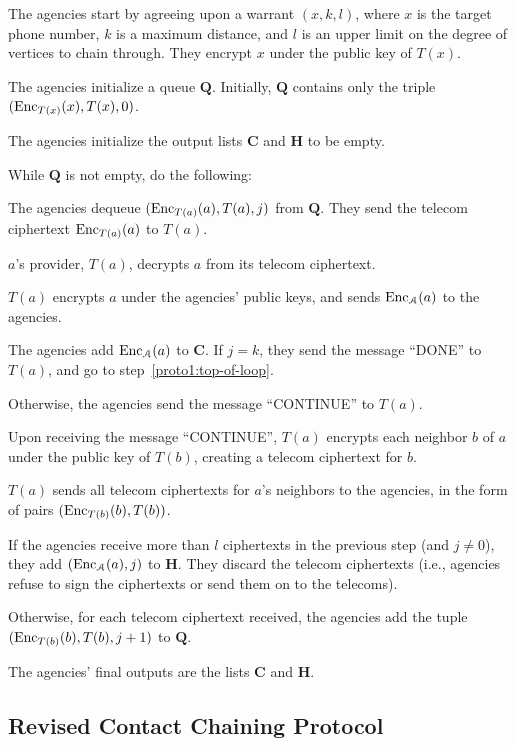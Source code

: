 \bce
\item The agencies start by agreeing upon a warrant $(x, k, l)$, where $x$ is the target phone number, $k$ is a maximum distance, and $l$ is an upper limit on the degree of vertices to chain through. They encrypt $x$ under the public key of $T(x)$.
\item The agencies initialize a queue $\mathbf{Q}$. Initially, $\mathbf{Q}$ contains only the triple $(\operatorname{Enc}_{T(x)}(x), T(x), 0)$.
\item The agencies initialize the output lists $\mathbf{C}$ and $\mathbf{H}$ to be empty.
\item While $\mathbf{Q}$ is not empty, do the following:
\bce
\item \label{proto1:top-of-loop} The agencies dequeue $(\operatorname{Enc}_{T(a)}(a), T(a), j)$ from $\mathbf{Q}$. They send the telecom ciphertext $\operatorname{Enc}_{T(a)}(a)$ to $T(a)$.
\item $a$'s provider, $T(a)$, decrypts $a$ from its telecom ciphertext.
\item \label{proto1:first-send} $T(a)$ encrypts $a$ under the agencies' public keys, and sends $\operatorname{Enc}_\mathcal{A}(a)$ to the agencies.
\item The agencies add $\operatorname{Enc}_\mathcal{A}(a)$ to $\mathbf{C}$. If $j=k$, they send the message ``DONE'' to $T(a)$, and go to step~\ref{proto1:top-of-loop}.
\item Otherwise, the agencies send the message ``CONTINUE'' to $T(a)$.
\item Upon receiving the message ``CONTINUE'', $T(a)$ encrypts each neighbor $b$ of $a$ under the public key of $T(b)$, creating a telecom ciphertext for $b$.
\item \label{proto1:second-send} $T(a)$ sends all telecom ciphertexts for $a$'s neighbors to the agencies, in the form of pairs $(\operatorname{Enc}_{T(b)}(b), T(b))$.
\item If the agencies receive more than $l$ ciphertexts in the previous step (and $j\neq 0$), they add $(\operatorname{Enc}_\mathcal{A}(a), j)$ to $\mathbf{H}$. They discard the telecom ciphertexts (i.e., agencies refuse to sign the ciphertexts or send them on to the telecoms).
\item Otherwise, for each telecom ciphertext received, the agencies add the tuple $(\operatorname{Enc}_{T(b)}(b), T(b), j+1)$ to $\mathbf{Q}$.
\ece
\item The agencies' final outputs are the lists $\mathbf{C}$ and $\mathbf{H}$.
\ece

\subsection{Revised Contact Chaining Protocol}
\label{sec:proto2}

